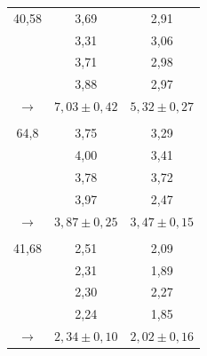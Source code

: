 \begin{table} [H]
\begin{subtable}[c]{0.5\textwidth}
\begin{tabular}{ c|c|c}
            40,58 & 3,69 & 2,91 \\
                & 3,31 & 3,06 \\
                & 3,71 & 2,98 \\
                & 3,88 & 2,97 \\
            \rowcolor{gray}$\to$ & $7,03 \pm 0,42$ & $5,32 \pm 0,27$ \\
                &  &  \\
            64,8 & 3,75 & 3,29 \\
                & 4,00 & 3,41 \\
                & 3,78 & 3,72 \\
                & 3,97 & 2,47 \\
            \rowcolor{gray}$\to$ & $3,87 \pm 0,25$ & $3,47 \pm 0,15$ \\
                &  &  \\
            41,68 & 2,51 & 2,09 \\
                & 2,31 & 1,89 \\
                & 2,30 & 2,27 \\
                & 2,24 & 1,85 \\
            \rowcolor{gray}$\to$ & $2,34 \pm 0,10$ & $2,02 \pm 0,16$ \\
        \bottomrule
        \end{tabular}
        \end{subtable}
\end{table}





